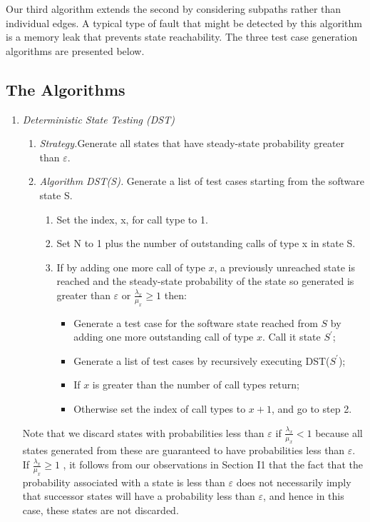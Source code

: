 \documentclass[journal, twoside]{IEEEtran}
\begin{document}
Our third algorithm extends the second by considering subpaths rather than individual edges. A typical type of fault that
might be detected by this algorithm is a memory leak that prevents state reachability. The three test case generation algorithms are presented below. 
\subsection{The Algorithms}
\begin{enumerate}
    \item \textit{Deterministic State Testing (DST) }
    \begin{enumerate}
        \item \textit{Strategy.}Generate all states that have steady-state probability greater than $\varepsilon$.
        \item \textit{Algorithm DST(S).} Generate a list of test cases starting from the software state S.
        \begin{enumerate}
            \item Set the index, x, for call type to 1.
            \item  Set N to 1 plus the number of outstanding calls of type x in state S.
            \item  If by adding one more call of type $x$,  a previously unreached state is reached and the steady-state probability of the state so generated is greater than $\varepsilon$ or $\frac{\lambda_x}{\mu_x}\geq1$  then:
            \begin{itemize}
                \item Generate a test case for the software state reached from $S$ by adding one more outstanding call of type $x$. Call it state $S^'$;
                \item Generate a list of test cases by recursively executing DST($S^'$); 
                \item If $x$ is greater than the number of call types return; 
                \item Otherwise set the index of call types to $x + 1$, and go to step 2.
            \end{itemize}
        \end{enumerate}
    \end{enumerate}
    Note that we discard states with probabilities less than $\varepsilon$ if
    $\frac{\lambda_x}{\mu_x}<1$  because all states generated from these are guaranteed to have probabilities less than $\varepsilon$. If $\frac{\lambda_x}{\mu_x}\geq1$ , it follows from our observations in Section I1 that the fact that the probability associated with a state is less than  $\varepsilon$ does not necessarily imply that successor states will have a probability less than $\varepsilon$, and hence in this case, these states are not discarded.
    

\end{enumerate}
\end{document}
